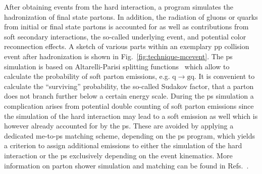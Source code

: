 After obtaining events from the hard interaction, a  program simulates the hadronization of final state partons. In addition, the radiation of gluons or quarks from initial or final state partons is accounted for as well as contributions from soft secondary interactions, the so-called underlying event, and potential color reconnection effects. A sketch of various parts within an exemplary pp collision event after hadronization is shown in Fig.~\ref{fig:technique-mcevent}. The \gls{ps} simulation is based on Altarelli-Parisi splitting functions~\cite{Altarelli:1977zs} which allow to calculate the probability of soft parton emissions, e.g. $\mathrm{q}\to \mathrm{gq}$. It is convenient to calculate the ``surviving'' probability, the so-called Sudakov factor, that a parton does not branch further below a certain energy scale. During the \gls{ps} simulation a complication arises from potential double counting of soft parton emissions since the simulation of the hard interaction may lead to a soft emission as well which is however already accounted for by the \gls{ps}. These are avoided by applying a dedicated \gls{me}-to-\gls{ps} matching scheme, depending on the \gls{ps} program, which yields a criterion to assign additional emissions to either the simulation of the hard interaction or the \gls{ps} exclusively depending on the event kinematics. More information on parton shower simulation and matching can be found in Refs.~\cite{Hoche:2014rga,Alwall:2007fs}.



